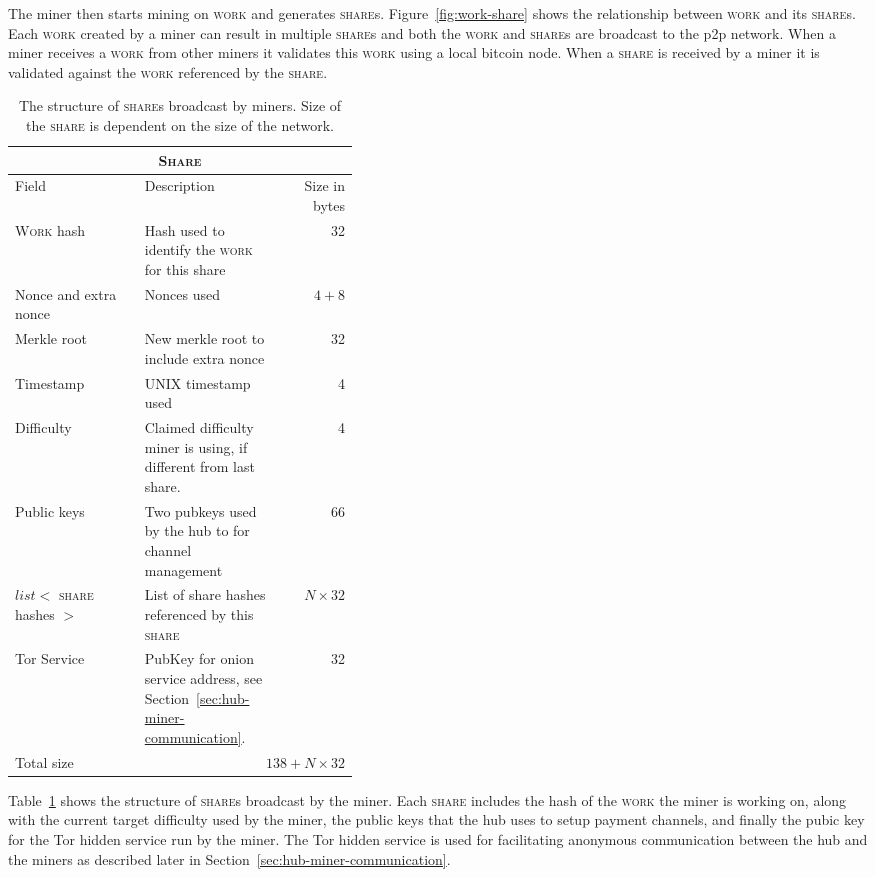 \documentclass{article}
\begin{document}
The miner then starts mining on \textsc{work} and generates
\textsc{share}s. Figure~\ref{fig:work-share} shows the relationship
between \textsc{work} and its \textsc{share}s. Each \textsc{work}
created by a miner can result in multiple \textsc{share}s and both the
\textsc{work} and \textsc{share}s are broadcast to the p2p
network. When a miner receives a \textsc{work} from other miners it
validates this \textsc{work} using a local bitcoin node. When a
\textsc{share} is received by a miner it is validated against the
\textsc{work} referenced by the \textsc{share}.

\begin{table}
  \centering
  \begin{tabular}{ lp{0.4\linewidth}r }
    \multicolumn{3}{c}{\textsc{Share}} \\
    \hline
    Field & Description & Size in bytes \\
    \hline
    \textsc{Work} hash & Hash used to identify the \textsc{work} for this share & 32 \\
    Nonce and extra nonce & Nonces used & $4+8$ \\
    Merkle root & New merkle root to include extra nonce & 32 \\
    Timestamp & UNIX timestamp used & 4 \\
    Difficulty & Claimed difficulty miner is using, if different from last share. & 4 \\
    Public keys & Two pubkeys used by the hub to for channel management & 66 \\
    $list<$ \textsc{share} hashes $>$ & List of share hashes referenced by this \textsc{share} & $N \times 32$ \\
    Tor Service & PubKey for onion service address, see Section~\ref{sec:hub-miner-communication}. & 32 \\
    \hline
    Total size & \multicolumn{2}{r}{$138 + N \times 32$} \\
    \hline
  \end{tabular}
  \caption{The structure of \textsc{share}s broadcast by miners. Size
    of the \textsc{share} is dependent on the size of the
    network.}\label{table:share}
\end{table}


Table~\ref{table:share} shows the structure of \textsc{share}s
broadcast by the miner. Each \textsc{share} includes the hash of the
\textsc{work} the miner is working on, along with the current target
difficulty used by the miner, the public keys that the hub uses to
setup payment channels, and finally the pubic key for the Tor hidden
service run by the miner. The Tor hidden service is used for
facilitating anonymous communication between the hub and the miners as
described later in Section~\ref{sec:hub-miner-communication}.
\end{document}
